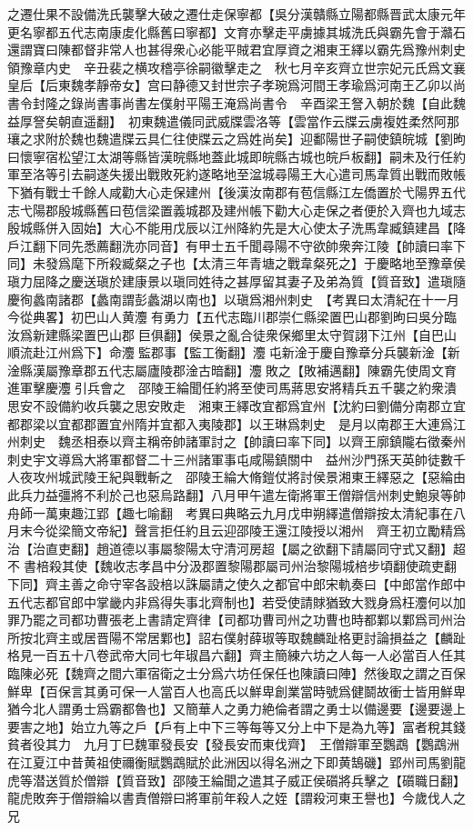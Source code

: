 之遷仕果不設備洗氏襲擊大破之遷仕走保寧都【吳分漢贛縣立陽都縣晋武太康元年更名寧都五代志南康䖍化縣舊曰寧都】文育亦擊走平虜據其城洗氏與霸先會于灨石還謂寶曰陳都督非常人也甚得衆心必能平賊君宜厚資之湘東王繹以霸先爲豫州刺史領豫章内史　辛丑裴之横攻稽亭徐嗣徽擊走之　秋七月辛亥齊立世宗妃元氏爲文襄皇后【后東魏孝靜帝女】宫曰静德又封世宗子孝琬爲河間王孝瑜爲河南王乙卯以尚書令封隆之錄尚書事尚書左僕射平陽王淹爲尚書令　辛酉梁王詧入朝於魏【自此魏益厚詧矣朝直遥翻】　初東魏遣儀同武威牒雲洛等【雲當作云牒云虜複姓柔然阿那瓖之求附於魏也魏遣牒云具仁往使牒云之爲姓尚矣】迎鄱陽世子嗣使鎮皖城【劉昫曰懷寧宿松望江太湖等縣皆漢晥縣地蓋此城即皖縣古城也皖戶板翻】嗣未及行任約軍至洛等引去嗣遂失援出戰敗死約遂略地至湓城尋陽王大心遣司馬韋質出戰而敗帳下猶有戰士千餘人咸勸大心走保建州【後漢汝南郡有苞信縣江左僑置於弋陽界五代志弋陽郡殷城縣舊曰苞信梁置義城郡及建州帳下勸大心走保之者便於入齊也九域志殷城縣併入固始】大心不能用戊辰以江州降約先是大心使太子洗馬韋臧鎮建昌【降戶江翻下同先悉薦翻洗亦同音】有甲士五千聞尋陽不守欲帥衆奔江陵【帥讀曰率下同】未發爲麾下所殺臧粲之子也【太清三年青塘之戰韋粲死之】于慶略地至豫章侯瑱力屈降之慶送瑱於建康景以瑱同姓待之甚厚留其妻子及弟為質【質音致】遣瑱隨慶徇蠡南諸郡【蠡南謂彭蠡湖以南也】以瑱爲湘州刺史　【考異曰太清紀在十一月今從典畧】初巴山人黄灋有勇力【五代志臨川郡崇仁縣梁置巴山郡劉昫曰吳分臨汝爲新建縣梁置巴山郡巨俱翻】侯景之亂合徒衆保鄉里太守賀詡下江州【自巴山順流赴江州爲下】命灋監郡事【監工衡翻】灋屯新淦于慶自豫章分兵襲新淦【新淦縣漢屬豫章郡五代志屬廬陵郡淦古暗翻】灋敗之【敗補邁翻】陳霸先使周文育進軍擊慶灋引兵會之　邵陵王綸聞任約將至使司馬蔣思安將精兵五千襲之約衆潰思安不設備約收兵襲之思安敗走　湘東王繹改宜都爲宜州【沈約曰劉備分南郡立宜都郡梁以宜都郡置宜州隋并宜都入夷陵郡】以王琳爲刺史　是月以南郡王大連爲江州刺史　魏丞相泰以齊主稱帝帥諸軍討之【帥讀曰率下同】以齊王廓鎮隴右徵秦州刺史宇文導爲大將軍都督二十三州諸軍事屯咸陽鎮關中　益州沙門孫天英帥徒數千人夜攻州城武陵王紀與戰斬之　邵陵王綸大脩鎧仗將討侯景湘東王繹惡之【惡綸由此兵力益彊將不利於己也惡烏路翻】八月甲午遣左衛將軍王僧辯信州刺史鮑泉等帥舟師一萬東趣江郢【趣七喻翻　考異曰典略云九月戊申朔繹遣僧辯按太清紀事在八月末今從梁簡文帝紀】聲言拒任約且云迎邵陵王還江陵授以湘州　齊王初立勵精爲治【治直吏翻】趙道德以事屬黎陽太守清河房超【屬之欲翻下請屬同守式又翻】超不書棓殺其使【魏收志孝昌中分汲郡置黎陽郡屬司州治黎陽城棓步頃翻使疏吏翻下同】齊主善之命守宰各設棓以誅屬請之使久之都官中郎宋軌奏曰【中郎當作郎中五代志都官郎中掌畿内非爲得失事北齊制也】若受使請賕猶致大戮身爲枉灋何以加罪乃罷之司都功曹張老上書請定齊律【司都功曹司州之功曹也時都鄴以鄴爲司州治所按北齊主或居晋陽不常居鄴也】詔右僕射薛琡等取魏麟趾格更討論損益之【麟趾格見一百五十八卷武帝大同七年琡昌六翻】齊主簡練六坊之人每一人必當百人任其臨陳必死【魏齊之間六軍宿衛之士分爲六坊任保任也陳讀曰陣】然後取之謂之百保鮮卑【百保言其勇可保一人當百人也高氏以鮮卑創業當時號爲健鬬故衝士皆用鮮卑猶今北人謂勇士爲霸都魯也】又簡華人之勇力絶倫者謂之勇士以備邊要【邊要邊上要害之地】始立九等之戶【戶有上中下三等每等又分上中下是為九等】富者稅其錢貧者役其力　九月丁巳魏軍發長安【發長安而東伐齊】　王僧辯軍至鸚鵡【鸚鵡洲在江夏江中昔黄祖使禰衡賦鸚鵡賦於此洲因以得名洲之下即黄鵠磯】郢州司馬劉龍虎等潜送質於僧辯【質音致】邵陵王綸聞之遣其子威正侯礩將兵擊之【礩職日翻】龍虎敗奔于僧辯綸以書責僧辯曰將軍前年殺人之姪【謂殺河東王譽也】今歲伐人之兄